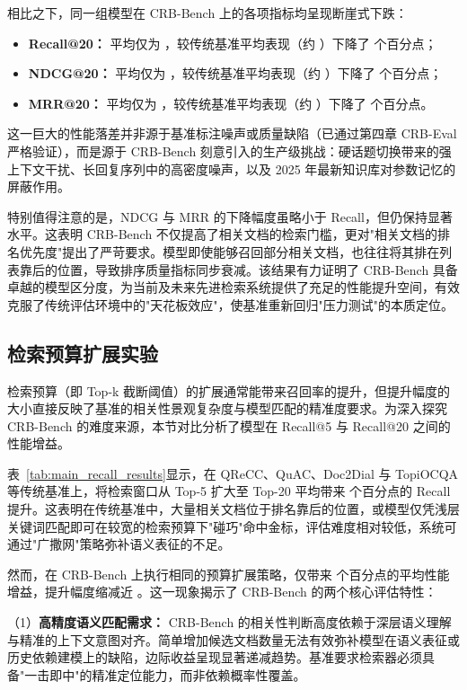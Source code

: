 相比之下，同一组模型在 CRB-Bench 上的各项指标均呈现断崖式下跌：
\begin{itemize}
    \item \textbf{Recall@20：} 平均仅为 ，较传统基准平均表现（约 ）下降了  个百分点；
    \item \textbf{NDCG@20：} 平均仅为 ，较传统基准平均表现（约 ）下降了  个百分点；
    \item \textbf{MRR@20：} 平均仅为 ，较传统基准平均表现（约 ）下降了  个百分点。
\end{itemize}

这一巨大的性能落差并非源于基准标注噪声或质量缺陷（已通过第四章 CRB-Eval 严格验证），而是源于 CRB-Bench 刻意引入的生产级挑战：硬话题切换带来的强上下文干扰、长回复序列中的高密度噪声，以及 2025 年最新知识库对参数记忆的屏蔽作用。



特别值得注意的是，NDCG 与 MRR 的下降幅度虽略小于 Recall，但仍保持显著水平。这表明 CRB-Bench 不仅提高了相关文档的检索门槛，更对"相关文档的排名优先度"提出了严苛要求。模型即使能够召回部分相关文档，也往往将其排在列表靠后的位置，导致排序质量指标同步衰减。该结果有力证明了 CRB-Bench 具备卓越的模型区分度，为当前及未来先进检索系统提供了充足的性能提升空间，有效克服了传统评估环境中的"天花板效应"，使基准重新回归"压力测试"的本质定位。

\subsection{检索预算扩展实验}
\label{subsec:budget_expansion}

检索预算（即 Top-k 截断阈值）的扩展通常能带来召回率的提升，但提升幅度的大小直接反映了基准的相关性景观复杂度与模型匹配的精准度要求。为深入探究 CRB-Bench 的难度来源，本节对比分析了模型在 Recall@5 与 Recall@20 之间的性能增益。

表~\ref{tab:main_recall_results}显示，在 QReCC、QuAC、Doc2Dial 与 TopiOCQA 等传统基准上，将检索窗口从 Top-5 扩大至 Top-20 平均带来  个百分点的 Recall 提升。这表明在传统基准中，大量相关文档位于排名靠后的位置，或模型仅凭浅层关键词匹配即可在较宽的检索预算下"碰巧"命中金标，评估难度相对较低，系统可通过"广撒网"策略弥补语义表征的不足。

然而，在 CRB-Bench 上执行相同的预算扩展策略，仅带来  个百分点的平均性能增益，提升幅度缩减近 \TBD{\%}。这一现象揭示了 CRB-Bench 的两个核心评估特性：

（1）\textbf{高精度语义匹配需求：} CRB-Bench 的相关性判断高度依赖于深层语义理解与精准的上下文意图对齐。简单增加候选文档数量无法有效弥补模型在语义表征或历史依赖建模上的缺陷，边际收益呈现显著递减趋势。基准要求检索器必须具备"一击即中"的精准定位能力，而非依赖概率性覆盖。

